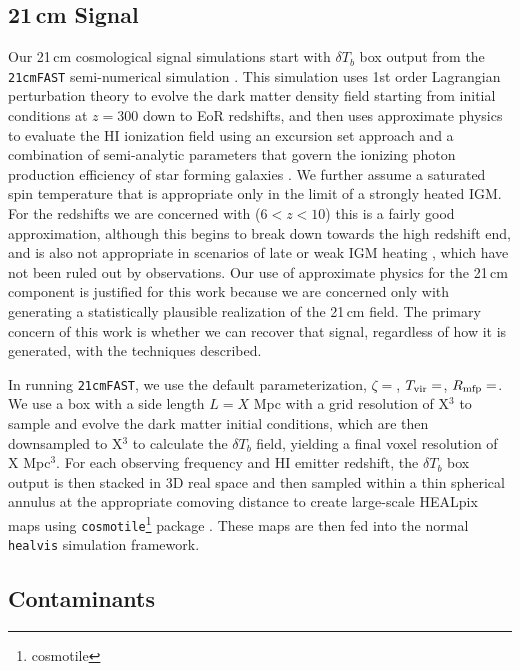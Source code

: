 \documentclass[a4paper,fleqn,usenatbib]{mnras}
\begin{document}
\subsection{21\,cm Signal}
Our 21\,cm cosmological signal simulations start with $\delta T_b$ box output from the \texttt{21cmFAST} semi-numerical simulation \citep{Mesinger2011}.
This simulation uses 1st order Lagrangian perturbation theory to evolve the dark matter density field starting from initial conditions at $z=300$ down to EoR redshifts, and then uses approximate physics to evaluate the HI ionization field using an excursion set approach and a combination of semi-analytic parameters that govern the ionizing photon production efficiency of star forming galaxies \citep{Furlanetto}.
We further assume a saturated spin temperature that is appropriate only in the limit of a strongly heated IGM.
For the redshifts we are concerned with ($6 < z < 10$) this is a fairly good approximation, although this begins to break down towards the high redshift end, and is also not appropriate in scenarios of late or weak IGM heating \citep{Greig, Mirocha}, which have not been ruled out by observations.
Our use of approximate physics for the 21\,cm component is justified for this work because we are concerned only with generating a statistically plausible realization of the 21\,cm field.
The primary concern of this work is whether we can recover that signal, regardless of how it is generated, with the techniques described.

In running \texttt{21cmFAST}, we use the default parameterization, $\zeta=$, $T_{\rm vir}=$, $R_{\rm mfp}=$.
We use a box with a side length $L=X$ Mpc with a grid resolution of X$^3$ to sample and evolve the dark matter initial conditions, which are then downsampled to X$^3$ to calculate the $\delta T_b$ field, yielding a final voxel resolution of X Mpc$^3$.
For each observing frequency and HI emitter redshift, the $\delta T_b$ box output is then stacked in 3D real space and then sampled within a thin spherical annulus at the appropriate comoving distance to create large-scale HEALpix maps using \texttt{cosmotile}\footnote{cosmotile} package \citep{Kitisiwit}.
These maps are then fed into the normal \texttt{healvis} simulation framework.



\subsection{Contaminants}
\label{sec:contaminants}
\end{document}
